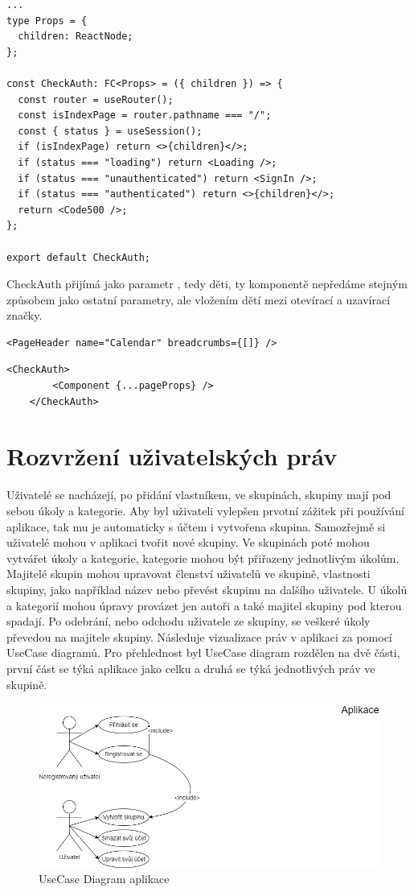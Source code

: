 \begin{lstlisting}[caption=Komponenta CheckAuth]
...
type Props = {
  children: ReactNode;
};

const CheckAuth: FC<Props> = ({ children }) => {
  const router = useRouter();
  const isIndexPage = router.pathname === "/";
  const { status } = useSession();
  if (isIndexPage) return <>{children}</>;
  if (status === "loading") return <Loading />;
  if (status === "unauthenticated") return <SignIn />;
  if (status === "authenticated") return <>{children}</>;
  return <Code500 />;
};

export default CheckAuth;

\end{lstlisting}
CheckAuth přijímá jako parametr , tedy děti, ty komponentě nepředáme stejným způsobem jako ostatní parametry, ale vložením dětí mezi otevírací a uzavírací značky.
\begin{lstlisting}[caption=Standardní předání parametrů komponentě]
    <PageHeader name="Calendar" breadcrumbs={[]} />
\end{lstlisting}
\begin{lstlisting}[caption=Předání dětí komponentě]
    <CheckAuth>
        <Component {...pageProps} />
    </CheckAuth>
\end{lstlisting}
\section{Rozvržení uživatelských práv}
Uživatelé se nacházejí, po přidání vlastníkem, ve skupinách, skupiny mají pod sebou úkoly a kategorie. Aby byl uživateli vylepšen prvotní zážitek při používání aplikace, tak mu je automaticky s účtem i vytvořena skupina. Samozřejmě si uživatelé mohou v aplikaci tvořit nové skupiny. Ve skupinách poté mohou vytvářet úkoly a kategorie, kategorie mohou být přiřazeny jednotlivým úkolům. Majitelé skupin mohou upravovat členství uživatelů ve skupině, vlastnosti skupiny, jako například název nebo převést skupinu na dalšího uživatele. U úkolů a kategorií mohou úpravy provázet jen autoři a také majitel skupiny pod kterou spadají. Po odebrání, nebo odchodu uživatele ze skupiny, se veškeré úkoly převedou na majitele skupiny. Následuje vizualizace práv v aplikaci za pomocí UseCase diagramů. Pro přehlednost byl UseCase diagram rozdělen na dvě části, první část se týká aplikace jako celku a druhá se týká jednotlivých práv ve skupině.

\begin{figure}[hbt!]
	\includegraphics[width=1\linewidth]{img/UseCaseAplikace.png}
	\caption{UseCase Diagram aplikace}
\end{figure}


